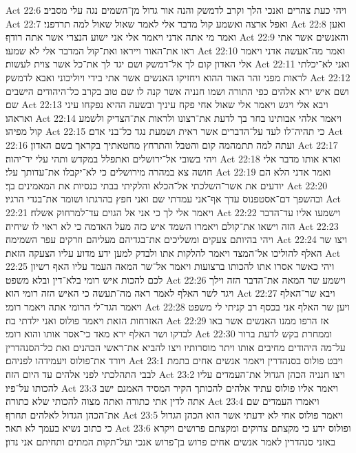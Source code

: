 Act 22:6  ויהי כעת צהרים ואנכי הלך וקרב לדמשק והנה אור גדול מן־השמים נגה עלי מסביב׃
Act 22:7  ואפל ארצה ואשמע קול מדבר אלי לאמר שאול שאול למה תרדפני׃
Act 22:8  ואען ואמר מי אתה אדני ויאמר אלי אני ישוע הנצרי אשר אתה רודף׃
Act 22:9  והאנשים אשר אתי ראו את־האור וייראו ואת־קול המדבר אלי לא שמעו׃
Act 22:10  ואמר מה־אעשה אדני ויאמר אלי האדון קום לך אל־דמשק ושם יגד לך את־כל אשר צוית לעשות׃
Act 22:11  ואני לא־יכלתי לראות מפני זהר האור ההוא ויחזיקו האנשים אשר אתי בידי ויוליכוני ואבא לדמשק׃
Act 22:12  ושם איש ירא אלהים כפי התורה ושמו חנניה אשר קנה לו שם טוב בקרב כל־היהודים הישבים שם׃
Act 22:13  ויבא אלי ויגש ויאמר אלי שאול אחי פקח עיניך ובשעה ההיא נפקחו עיני ואראהו׃
Act 22:14  ויאמר אלהי אבותינו בחר בך לדעת את־רצונו ולראות את־הצדיק ולשמע קול מפיהו׃
Act 22:15  כי תהיה־לו לעד על־הדברים אשר ראית ושמעת נגד כל־בני אדם׃
Act 22:16  ועתה למה תתמהמה קום והטבל והתרחץ מחטאתיך בקראך בשם האדון׃
Act 22:17  ויהי בשובי אל־ירושלים ואתפלל במקדש ותהי עלי יד־יהוה׃
Act 22:18  וארא אותו מדבר אלי חושה צא במהרה מירושלים כי לא־יקבלו את־עדותך עלי׃
Act 22:19  ואמר אדני הלא הם יודעים את אשר־השלכתי אל־הכלא והלקיתי בבתי כנסיות את המאמינים בך׃
Act 22:20  ובהשפך דם־אסטפנוס עדך אף־אני עמדתי שם ואני חפץ בהרגתו ושומר את־בגדי הרגיו׃
Act 22:21  ויאמר אלי לך כי אני אל הגוים עד־למרחוק אשלח׃
Act 22:22  וישמעו אליו עד־הדבר הזה וישאו את־קולם ויאמרו השמד איש כזה מעל האדמה כי לא ראוי לו שיחיה׃
Act 22:23  ויהי בהיותם צעקים ומשליכים את־בגדיהם מעליהם וזרקים עפר השמימה׃
Act 22:24  ויצו שר האלף להוליכו אל־המצד ויאמר להלקות אתו ולבדק למען ידע מדוע עליו הצעקה הזאת׃
Act 22:25  ויהי כאשר אסרו אתו להכותו ברצועות ויאמר אל־שר המאה העמד עליו האף רשיון לכם להכות איש רומי בלא־דין ובלא משפט׃
Act 22:26  וישמע שר המאה את־הדבר הזה וילך ויגד לשר האלף לאמר ראה מה־תעשה כי האיש הזה רומי הוא׃
Act 22:27  ויבא שר־האלף ויאמר הגד־לי הרומי אתה ויאמר רומי׃
Act 22:28  ויען שר האלף אני בכסף רב קניתי לי משפט האזרחות הזאת ויאמר פולוס ואני ילדתי בה׃
Act 22:29  אז הרפו ממנו האנשים אשר באו לבדקו ושר האלף ירא מאד כי־אסר אותו והוא רומי׃
Act 22:30  וממחרת בקש לדעת ברור על־מה היהודים מחיבים אותו ויתר מוסרותיו ויצו להביא את־ראשי הכהנים ואת כל־הסנהדרין ויורד את־פולוס ויעמידהו לפניהם׃
Act 23:1  ויבט פולוס בסנהדרין ויאמר אנשים אחים בתמת לבבי התהלכתי לפני אלהים עד היום הזה׃
Act 23:2  ויצו חנניה הכהן הגדול את־העמדים עליו להכותו על־פיו׃
Act 23:3  ויאמר אליו פולוס עתיד אלהים להכותך הקיר המסיד האמנם ישב אתה לדין אתי כתורה ואתה מצוה להכותי שלא כתורה׃
Act 23:4  ויאמרו העמדים שם את־הכהן הגדול לאלהים תחרף׃
Act 23:5  ויאמר פולוס אחי לא ידעתי אשר הוא הכהן הגדול כי כתוב נשיא בעמך לא תאר׃
Act 23:6  ופולוס ידע כי מקצתם צדוקים ומקצתם פרושים ויקרא באזני סנהדרין לאמר אנשים אחים פרוש בן־פרוש אנכי ועל־תקות המתים ותחיתם אני נדון׃
